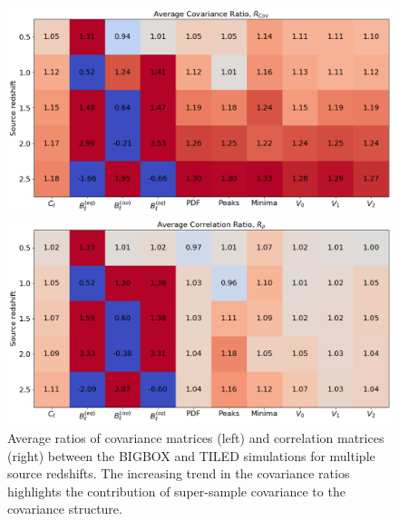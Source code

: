 \begin{figure}[ht]
    \begin{minipage}{0.48\textwidth}
        \centering
        \includegraphics[width=\textwidth]{figures/results/avg_cov_ratio_main.png}
    \end{minipage}
    \begin{minipage}{0.48\textwidth}
        \centering
        \includegraphics[width=\textwidth]{figures/results/avg_corr_ratio_main.png}
    \end{minipage}
    \caption[Average BIGBOX/TILED Ratios of Covariance and Correlation Matrices]{Average ratios of covariance matrices (left) and correlation matrices (right) between the BIGBOX and TILED simulations for multiple source redshifts. The increasing trend in the covariance ratios highlights the contribution of super-sample covariance to the covariance structure.}
    \label{fig:avg_main}
\end{figure}

